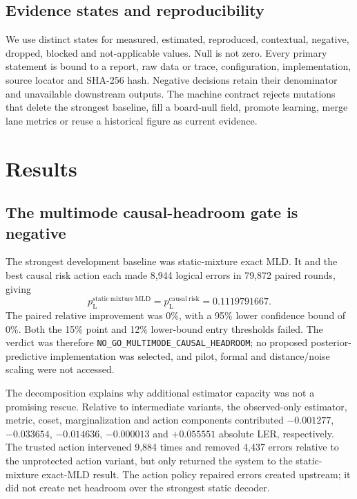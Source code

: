 \documentclass[11pt]{article}
\newcommand{\pL}{p_{\mathrm L}}
\begin{document}
\subsection{Evidence states and reproducibility}

We use distinct states for measured, estimated, reproduced, contextual,
negative, dropped, blocked and not-applicable values.  Null is not zero.  Every
primary statement is bound to a report, raw data or trace, configuration,
implementation, source locator and SHA-256 hash.  Negative decisions retain
their denominator and unavailable downstream outputs.  The machine contract
rejects mutations that delete the strongest baseline, fill a board-null field,
promote learning, merge lane metrics or reuse a historical figure as current
evidence.

\section{Results}

\subsection{The multimode causal-headroom gate is negative}

The strongest development baseline was static-mixture exact MLD.  It and the
best causal risk action each made 8,944 logical errors in 79,872 paired rounds,
giving
\begin{equation}
  \pL^{\mathrm{static\ mixture\ MLD}}
  =\pL^{\mathrm{causal\ risk}}=0.1119791667.
\end{equation}
The paired relative improvement was 0\%, with a 95\% lower confidence bound of
0\%.  Both the 15\% point and 12\% lower-bound entry thresholds failed.  The
verdict was therefore \texttt{NO\_GO\_MULTIMODE\_CAUSAL\_HEADROOM}; no proposed
posterior-predictive implementation was selected, and pilot, formal and
distance/noise scaling were not accessed.

The decomposition explains why additional estimator capacity was not a
promising rescue.  Relative to intermediate variants, the observed-only
estimator, metric, coset, marginalization and action components contributed
$-0.001277$, $-0.033654$, $-0.014636$, $-0.000013$ and $+0.055551$ absolute LER,
respectively.  The trusted action intervened 9,884 times and removed 4,437
errors relative to the unprotected action variant, but only returned the
system to the static-mixture exact-MLD result.  The action policy repaired
errors created upstream; it did not create net headroom over the strongest
static decoder.
\end{document}
